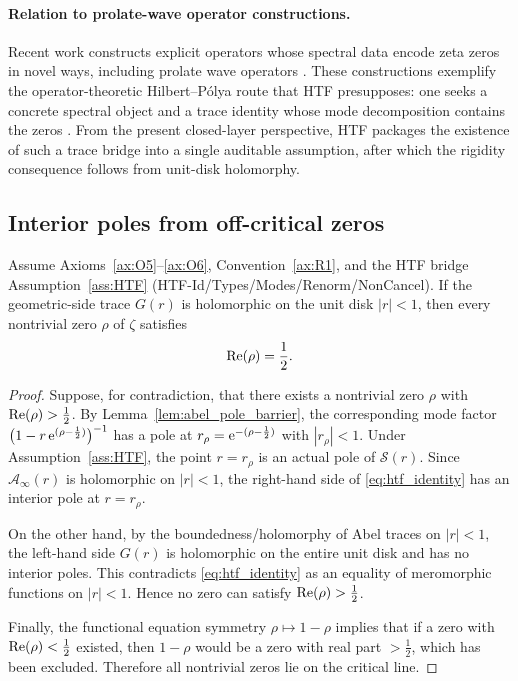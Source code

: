 \paragraph{Relation to prolate-wave operator constructions.}
Recent work constructs explicit operators whose spectral data encode zeta zeros in novel ways, including prolate wave operators \cite{ConnesConsaniMoscovici2024}.
These constructions exemplify the operator-theoretic Hilbert--P\'olya route that HTF presupposes: one seeks a concrete spectral object and a trace identity whose mode decomposition contains the zeros \cite{BerryKeating1999}.
From the present closed-layer perspective, HTF packages the existence of such a trace bridge into a single auditable assumption, after which the rigidity consequence follows from unit-disk holomorphy.

\subsection{Interior poles from off-critical zeros}
\label{sec:bad_zero_pole}

\begin{theorem}
\label{thm:rh_conditional}
Assume Axioms~\ref{ax:O5}--\ref{ax:O6}, Convention~\ref{ax:R1}, and the HTF bridge Assumption~\ref{ass:HTF} (HTF-Id/Types/Modes/Renorm/NonCancel).
If the geometric-side trace $G(r)$ is holomorphic on the unit disk $|r|<1$, then every nontrivial zero $\rho$ of $\zeta$ satisfies
\[
\operatorname{Re}(\rho)=\frac12.
\]
\end{theorem}

\begin{proof}
Suppose, for contradiction, that there exists a nontrivial zero $\rho$ with $\operatorname{Re}(\rho)>\tfrac12$.
By Lemma~\ref{lem:abel_pole_barrier}, the corresponding mode factor
$\bigl(1-r\,\mathrm{e}^{(\rho-\frac12)}\bigr)^{-1}$ has a pole at $r_\rho=\mathrm{e}^{-(\rho-\frac12)}$ with $|r_\rho|<1$.
Under Assumption~\ref{ass:HTF}, the point $r=r_\rho$ is an actual pole of $\mathcal{S}(r)$.
Since $\mathcal{A}_{\infty}(r)$ is holomorphic on $|r|<1$, the right-hand side of \eqref{eq:htf_identity} has an interior pole at $r=r_\rho$.

On the other hand, by the boundedness/holomorphy of Abel traces on $|r|<1$, the left-hand side $G(r)$ is holomorphic on the entire unit disk and has no interior poles.
This contradicts \eqref{eq:htf_identity} as an equality of meromorphic functions on $|r|<1$.
Hence no zero can satisfy $\operatorname{Re}(\rho)>\tfrac12$.

Finally, the functional equation symmetry $\rho\mapsto 1-\rho$ implies that if a zero with $\operatorname{Re}(\rho)<\tfrac12$ existed, then $1-\rho$ would be a zero with real part $>\tfrac12$, which has been excluded.
Therefore all nontrivial zeros lie on the critical line.
\end{proof}

